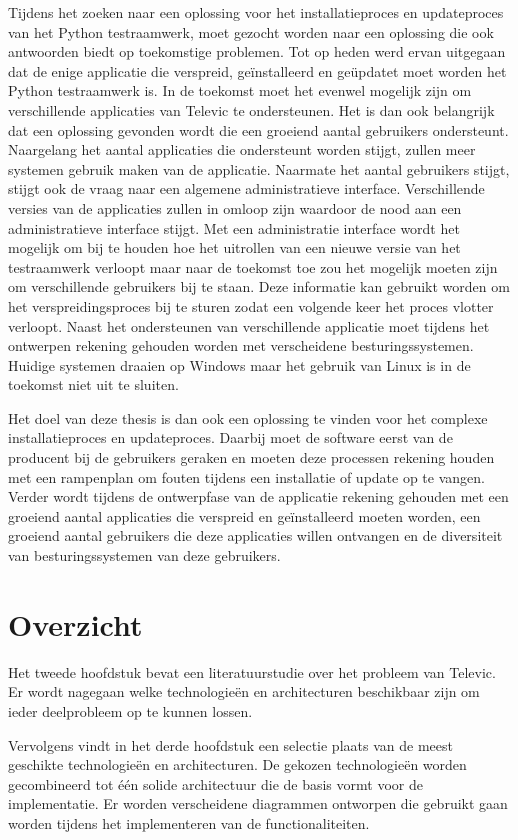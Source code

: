 Tijdens het zoeken naar een oplossing voor het installatieproces en updateproces van het Python testraamwerk, moet gezocht worden naar een oplossing die ook antwoorden biedt op toekomstige problemen.
Tot op heden werd ervan uitgegaan dat de enige applicatie die verspreid, geïnstalleerd en geüpdatet moet worden het Python testraamwerk is.
In de toekomst moet het evenwel mogelijk zijn om verschillende applicaties van Televic te ondersteunen.
Het is dan ook belangrijk dat een oplossing gevonden wordt die een groeiend aantal gebruikers ondersteunt.
Naargelang het aantal applicaties die ondersteunt worden stijgt, zullen meer systemen gebruik maken van de applicatie.
Naarmate het aantal gebruikers stijgt, stijgt ook de vraag naar een algemene administratieve interface.
Verschillende versies van de applicaties zullen in omloop zijn waardoor de nood aan een administratieve interface stijgt. 
Met een administratie interface wordt het mogelijk om bij te houden hoe het uitrollen van een nieuwe versie van het testraamwerk verloopt maar naar de toekomst toe zou het mogelijk moeten zijn om verschillende gebruikers bij te staan.
Deze informatie kan gebruikt worden om het verspreidingsproces bij te sturen zodat een volgende keer het proces vlotter verloopt.
Naast het ondersteunen van verschillende applicatie moet tijdens het ontwerpen rekening gehouden worden met verscheidene besturingssystemen.
Huidige systemen draaien op Windows maar het gebruik van Linux is in de toekomst niet uit te sluiten.

Het doel van deze thesis is dan ook een oplossing te vinden voor het complexe installatieproces en updateproces.
Daarbij moet de software eerst van de producent bij de gebruikers geraken en moeten deze processen rekening houden met een rampenplan om fouten tijdens een installatie of update op te vangen.
Verder wordt tijdens de ontwerpfase van de applicatie rekening gehouden met een groeiend aantal applicaties die verspreid en geïnstalleerd moeten worden, een groeiend aantal gebruikers die deze applicaties willen ontvangen en de diversiteit van besturingssystemen van deze gebruikers.

\section{Overzicht}
Het tweede hoofdstuk bevat een literatuurstudie over het probleem van Televic.
Er wordt nagegaan welke technologieën en architecturen beschikbaar zijn om ieder deelprobleem op te kunnen lossen.

Vervolgens vindt in het derde hoofdstuk een selectie plaats van de meest geschikte technologieën en architecturen.
De gekozen technologieën worden gecombineerd tot één solide architectuur die de basis vormt voor de implementatie.
Er worden verscheidene diagrammen ontworpen die gebruikt gaan worden tijdens het implementeren van de functionaliteiten.

